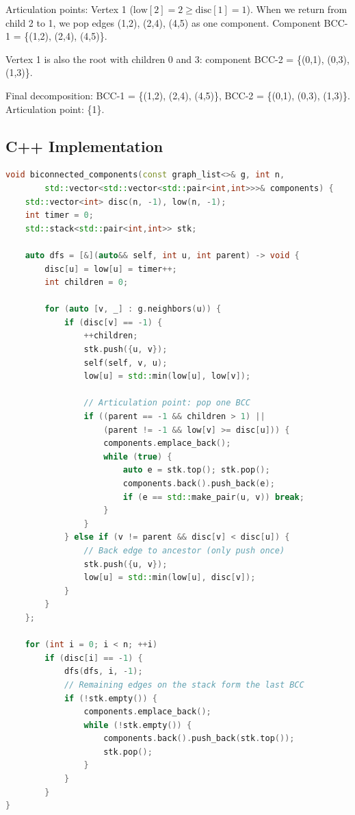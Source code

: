 Articulation points: Vertex 1 ($\text{low}[2] = 2 \ge \text{disc}[1] = 1$). When we return from child 2 to 1, we pop edges (1,2), (2,4), (4,5) as one component. Component BCC-1 = \{(1,2), (2,4), (4,5)\}.

Vertex 1 is also the root with children 0 and 3: component BCC-2 = \{(0,1), (0,3), (1,3)\}.

Final decomposition: BCC-1 = \{(1,2), (2,4), (4,5)\}, BCC-2 = \{(0,1), (0,3), (1,3)\}. Articulation point: \{1\}.

\subsection{C++ Implementation}

\begin{lstlisting}[language=C++]
void biconnected_components(const graph_list<>& g, int n,
        std::vector<std::vector<std::pair<int,int>>>& components) {
    std::vector<int> disc(n, -1), low(n, -1);
    int timer = 0;
    std::stack<std::pair<int,int>> stk;

    auto dfs = [&](auto&& self, int u, int parent) -> void {
        disc[u] = low[u] = timer++;
        int children = 0;

        for (auto [v, _] : g.neighbors(u)) {
            if (disc[v] == -1) {
                ++children;
                stk.push({u, v});
                self(self, v, u);
                low[u] = std::min(low[u], low[v]);

                // Articulation point: pop one BCC
                if ((parent == -1 && children > 1) ||
                    (parent != -1 && low[v] >= disc[u])) {
                    components.emplace_back();
                    while (true) {
                        auto e = stk.top(); stk.pop();
                        components.back().push_back(e);
                        if (e == std::make_pair(u, v)) break;
                    }
                }
            } else if (v != parent && disc[v] < disc[u]) {
                // Back edge to ancestor (only push once)
                stk.push({u, v});
                low[u] = std::min(low[u], disc[v]);
            }
        }
    };

    for (int i = 0; i < n; ++i)
        if (disc[i] == -1) {
            dfs(dfs, i, -1);
            // Remaining edges on the stack form the last BCC
            if (!stk.empty()) {
                components.emplace_back();
                while (!stk.empty()) {
                    components.back().push_back(stk.top());
                    stk.pop();
                }
            }
        }
}
\end{lstlisting}

